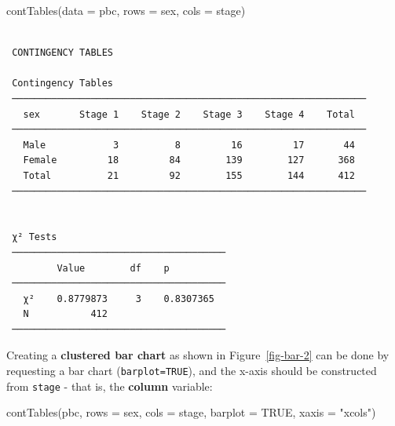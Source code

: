 \documentclass[
  a4paper,
]{memoir}
\newenvironment{Shaded}{\begin{snugshade}}{\end{snugshade}}
\newcommand{\AttributeTok}[1]{\textcolor[rgb]{0.00,0.00,0.00}{#1}}
\newcommand{\ConstantTok}[1]{\textcolor[rgb]{0.00,0.00,0.00}{#1}}
\newcommand{\FunctionTok}[1]{\textcolor[rgb]{0.00,0.00,0.00}{#1}}
\newcommand{\NormalTok}[1]{\textcolor[rgb]{0.00,0.00,0.00}{#1}}
\newcommand{\StringTok}[1]{\textcolor[rgb]{0.00,0.00,0.00}{#1}}
\begin{document}
\begin{Shaded}
\begin{Highlighting}[]
\FunctionTok{contTables}\NormalTok{(}\AttributeTok{data =}\NormalTok{ pbc, }\AttributeTok{rows =}\NormalTok{ sex, }\AttributeTok{cols =}\NormalTok{ stage)}
\end{Highlighting}
\end{Shaded}

\begin{verbatim}

 CONTINGENCY TABLES

 Contingency Tables                                              
 ─────────────────────────────────────────────────────────────── 
   sex       Stage 1    Stage 2    Stage 3    Stage 4    Total   
 ─────────────────────────────────────────────────────────────── 
   Male            3          8         16         17       44   
   Female         18         84        139        127      368   
   Total          21         92        155        144      412   
 ─────────────────────────────────────────────────────────────── 


 χ² Tests                               
 ────────────────────────────────────── 
         Value        df    p           
 ────────────────────────────────────── 
   χ²    0.8779873     3    0.8307365   
   N           412                      
 ────────────────────────────────────── 
\end{verbatim}

Creating a \textbf{clustered bar chart} as shown in
Figure~\ref{fig-bar-2} can be done by requesting a bar chart
(\texttt{barplot=TRUE}), and the x-axis should be constructed from
\texttt{stage} - that is, the \textbf{column} variable:

\begin{Shaded}
\begin{Highlighting}[]
\FunctionTok{contTables}\NormalTok{(pbc, }\AttributeTok{rows =}\NormalTok{ sex, }\AttributeTok{cols =}\NormalTok{ stage, }\AttributeTok{barplot =} \ConstantTok{TRUE}\NormalTok{, }\AttributeTok{xaxis =} \StringTok{"xcols"}\NormalTok{)}
\end{Highlighting}
\end{Shaded}
\end{document}
